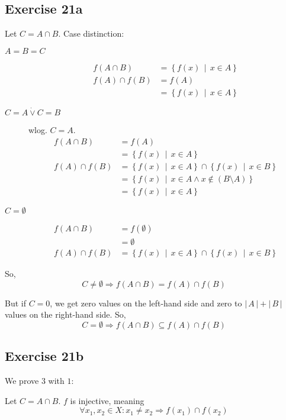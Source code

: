 \documentclass[a4paper]{article}
\theoremstyle{definition}
\newcommand\setdef[2]{\left\{#1\,\middle|\,#2\right\}}
\newcommand\card[1]{\left|\,#1\,\right|}
\begin{document}
\subsection{Exercise 21a}

Let $C = A \cap B$. Case distinction:
\begin{description}
  \item[$A = B = C$]
    \begin{align*}
         f(A \cap B) &= \setdef{f(x)}{x \in A} \\
      f(A) \cap f(B) &= f(A) \\
                     &= \setdef{f(x)}{x \in A}
    \end{align*}
  \item[$C = A \dot\lor C = B$]
    wlog. $C = A$.
    \begin{align*}
         f(A \cap B) &= f(A) \\
                     &= \setdef{f(x)}{x \in A} \\
      f(A) \cap f(B) &= \setdef{f(x)}{x \in A} \cap \setdef{f(x)}{x \in B} \\
                     &= \setdef{f(x)}{x \in A \land x \not\in (B \setminus A)} \\
                     &= \setdef{f(x)}{x \in A}
    \end{align*}
  \item[$C = \emptyset$]
    \begin{align*}
      f(A \cap B)    &= f(\emptyset) \\
                     &= \emptyset \\
      f(A) \cap f(B) &= \setdef{f(x)}{x \in A} \cap \setdef{f(x)}{x \in B}
    \end{align*}
\end{description}

So,
\[ C \neq \emptyset \Rightarrow f(A \cap B) = f(A) \cap f(B) \]

But if $C = 0$, we get zero values on the left-hand side and zero to $\card{A} + \card{B}$ values on the right-hand side.
So,
\[ C = \emptyset \Rightarrow f(A \cap B) \subseteq f(A) \cap f(B) \]

\subsection{Exercise 21b}

We prove $3$ with $1$:

Let $C = A \cap B$. $f$ is injective, meaning
\[ \forall x_1, x_2 \in X: x_1 \neq x_2 \Rightarrow f(x_1) \cap f(x_2) \]
\end{document}
